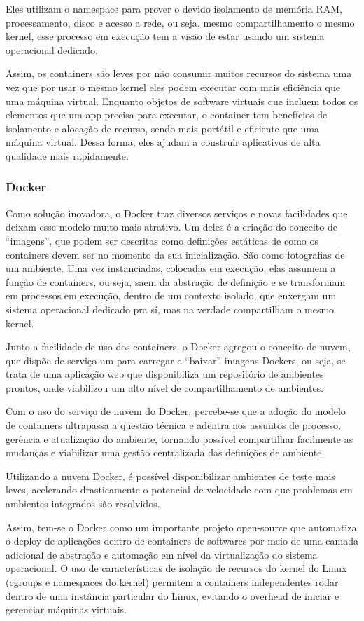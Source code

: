     Eles utilizam o namespace para prover o devido isolamento de memória RAM,
    processamento, disco e acesso a rede, ou seja, mesmo compartilhamento o
    mesmo kernel, esse processo em execução tem a visão de estar usando um
    sistema operacional dedicado.

    Assim, os containers são leves por não consumir muitos recursos do
    sistema uma vez que por usar o mesmo kernel eles podem executar com
    mais eficiência que uma máquina virtual. Enquanto objetos de software
    virtuais que incluem todos os elementos que um app precisa para executar,
    o container tem benefícios de isolamento e alocação de recurso, sendo
    mais portátil e eficiente que uma máquina virtual. Dessa forma, eles
    ajudam a construir aplicativos de alta qualidade mais rapidamente.

    \subsubsection{Docker}
    Como solução inovadora, o Docker traz diversos serviços e novas
    facilidades que deixam esse modelo muito mais atrativo. Um deles
    é a criação do conceito de “imagens”, que podem ser descritas como
    definições estáticas de como os containers devem ser no momento da
    sua inicialização. São como fotografias de um ambiente. Uma vez
    instanciadas, colocadas em execução, elas assumem a função de
    containers, ou seja, saem da abstração de definição e se transformam
    em processos em execução, dentro de um contexto isolado, que
    enxergam um sistema operacional dedicado pra sí, mas na verdade
    compartilham o mesmo kernel.

    Junto a facilidade de uso dos containers, o Docker agregou o
    conceito de nuvem, que dispõe de serviço um para carregar e
    “baixar” imagens Dockers, ou seja, se trata de uma aplicação
    web que disponibiliza um repositório de ambientes prontos,
    onde viabilizou um alto nível de compartilhamento de ambientes.

    Com o uso do serviço de nuvem do Docker, percebe-se que a
    adoção do modelo de containers ultrapassa a questão técnica
    e adentra nos assuntos de processo, gerência e atualização
    do ambiente, tornando possível compartilhar facilmente as
    mudanças e viabilizar uma gestão centralizada das definições
    de ambiente.

    Utilizando a nuvem Docker, é possível disponibilizar ambientes de
    teste mais leves, acelerando drasticamente o potencial de velocidade
    com que problemas em ambientes integrados são resolvidos.

    Assim, tem-se o Docker como um importante projeto open-source
    que automatiza o deploy de aplicações dentro de containers de
    softwares por meio de uma camada adicional de abstração e automação
    em nível da virtualização do sistema operacional. O uso de
    características de isolação de recursos do kernel do Linux
    (cgroups e namespaces do kernel) permitem a containers
    independentes rodar dentro de uma instância particular do Linux,
    evitando o overhead de iniciar e gerenciar máquinas virtuais.
